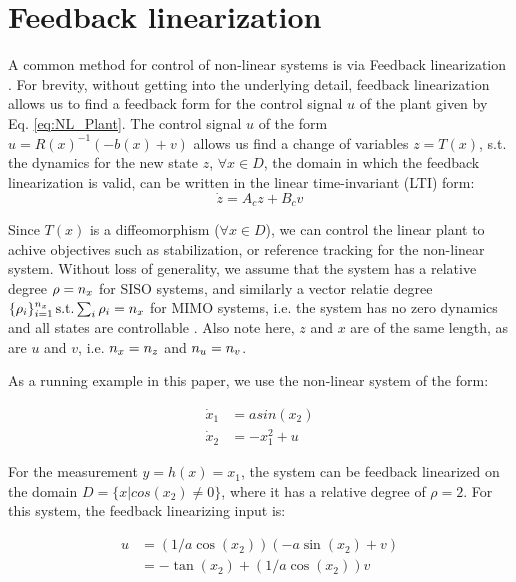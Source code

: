 \section{Feedback linearization}
\label{sec:feedbacklin}
A common method for control of non-linear systems is via Feedback linearization \cite{khalil}. For brevity, without getting into the underlying detail, feedback linearization allows us to find a feedback form for the control signal $u$ of the plant given by Eq. \ref{eq:NL_Plant}. The control signal $u$ of the form $u = R(x)^{-1}(-b(x)+v)$ allows us find a change of variables $z=T(x)$, s.t. the dynamics for the new state $z$, $\forall x \in D$, the domain in which the feedback linearization is valid, can be written in the linear time-invariant (LTI) form:
\begin{equation}
\label{eq:LTI_fb_lin}
\dot{z} = A_cz + B_cv
\end{equation}

Since $T(x)$ is a diffeomorphism ($\forall x \in D$), we can control the linear plant to achive objectives such as stabilization, or reference tracking for the non-linear system. Without loss of generality, we assume that the system has a relative degree $\rho=n_x$ for SISO systems, and similarly a vector relatie degree $\lbrace \rho_i \rbrace_{i=1}^{n_x}\, \text{s.t.} \sum_i \rho_i = n_x$ for MIMO systems, i.e. the system has no zero dynamics and all states are controllable \cite{khalil}. Also note here, $z$ and $x$ are of the same length, as are $u$ and $v$, i.e. $n_x = n_z$ and $n_u = n_v$.


 As a running example in this paper, we use the non-linear system of the form:

\begin{subequations}
\begin{align}
\dot{x}_1 &= asin(x_2) \\
\dot{x}_2 &=-x_1^2 + u 
\end{align}
\end{subequations}

For the measurement $y = h(x) = x_1$, the system can be feedback linearized on the domain $D = \lbrace x | cos(x_2) \neq 0 \rbrace $, where it has a relative degree of $\rho=2$. For this system, the feedback linearizing input is:

\begin{subequations}
\begin{align}
u &= (1/a\cos(x_2))(-a\sin(x_2)+v) \nonumber \\
&= -\tan(x_2) + (1/a\cos(x_2))v
\end{align}
\end{subequations}

